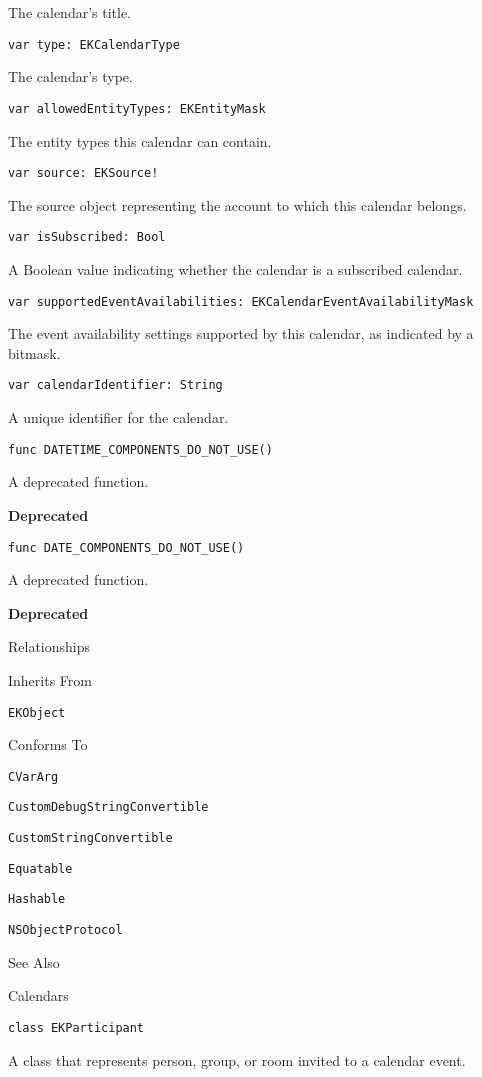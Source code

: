 \documentclass{article}
\begin{document}
The calendar's title.

\texttt{var type: EKCalendarType}

The calendar's type.

\texttt{var allowedEntityTypes: EKEntityMask}

The entity types this calendar can contain.

\texttt{var source: EKSource!}

The source object representing the account to which this calendar belongs.

\texttt{var isSubscribed: Bool}

A Boolean value indicating whether the calendar is a subscribed calendar.

\texttt{var supportedEventAvailabilities: EKCalendarEventAvailabilityMask}

The event availability settings supported by this calendar, as indicated by a bitmask.

\texttt{var calendarIdentifier: String}

A unique identifier for the calendar.

\texttt{func DATETIME\_COMPONENTS\_DO\_NOT\_USE()}

A deprecated function.

\textbf{Deprecated}

\texttt{func DATE\_COMPONENTS\_DO\_NOT\_USE()}

A deprecated function.

\textbf{Deprecated}

Relationships

Inherits From

\texttt{EKObject}

Conforms To

\texttt{CVarArg}

\texttt{CustomDebugStringConvertible}

\texttt{CustomStringConvertible}

\texttt{Equatable}

\texttt{Hashable}

\texttt{NSObjectProtocol}

See Also

Calendars

\texttt{class EKParticipant}

A class that represents person, group, or room invited to a calendar event.

\newpage
\end{document}
